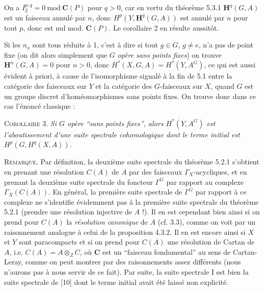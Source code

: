 \clearpage
{}

\noindent On a $I_2^{p,q}=0\ \mathrm{mod}\ {\mathbf C}(P)$ pour $q>0$, car en
vertu du théorème 5.3.1 $\mathbf H^q(G,A)$ est un faisceau annulé par $n$,
donc $H^p(Y,\mathbf H^q(G,A))$ est annulé par $n$ pour tout $p$, donc est nul
mod. ${\mathbf C}(P)$. Le corollaire 2 en résulte aussitôt.

Si les $n_x$ sont tous réduits à 1, c'est à dire si tout $g\in G$, $g\ne e$,
n'a pas de point fixe (on dit alors simplement que $G$ \textit{opère sans
points fixes}) on trouve $\mathbf H^n(G,A)=0$ pour $n>0$, donc
$H^*(X,G,A)=H^*(Y,A^G)$, ce qui est aussi évident à priori, à cause de
l'isomorphisme signalé à la fin de 5.1 entre la catégorie des faisceaux sur
$Y$ et la catégorie des $G$-faisceaux sur $X$, quand $G$ est un groupe discret
d'homéomorphismes sans points fixes. On trouve donc dans ce cas l'énoncé
classique :

\textsc{Corollaire 3.} \textit{Si $G$ opère ``sans points fixes'',
alors $H^*(Y,A^G)$ est l'aboutissement d'une suite spectrale cohomologique dont
le terme initial est $H^p(G,H^q(X,A))$.}

\textsc{Remarque.} Par définition, la deuxième suite spectrale du
théorème 5.2.1 s'obtient en prenant une résolution $C(A)$ de $A$ par des
faisceaux $\Gamma_X$-acycliques, et en prenant la deuxième suite spectrale du
foncteur $\Gamma^G$ par rapport au complexe $\Gamma_X(C(A))$. En général, la
première suite spectrale de $\Gamma^G$ par rapport à ce complexe ne s'identifie
évidemment pas à la première suite spectrale du théorème 5.2.1 (prendre une
résolution injective de $A$ !). Il en est cependant bien ainsi si on prend pour
$C(A)$ la \textit{résolution canonique} de $A$ (cf. 3.3), comme on voit par un
raisonnement analogue à celui de la proposition 4.3.2. Il en est encore ainsi
si $X$ et $Y$ sont paracompacts et si on prend pour $C(A)$ une résolution de
Cartan de $A$, i.e. $C(A)=A\otimes_ZC$, où ${\mathbf C}$ est un ``faisceau
fondamental'' au sens de Cartan-Leray, comme on peut montrer par des
raisonnements assez différents (nous n'aurons pas à nous servir de ce fait).
Par suite, la suite spectrale I est bien la suite spectrale de [10] dont le
terme initial avait été laissé non explicité.


